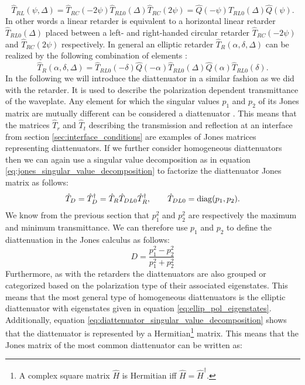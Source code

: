 \begin{equation}
    \hat{T}_{RL}(\psi, \Delta)=\hat{T}_{RC}(-2\psi)\hat{T}_{RL0}(\Delta)\hat{T}_{RC}(2\psi)=
    \hat{Q}(-\psi)\hat{T}_{RL0}(\Delta)\hat{Q}(\psi).
\end{equation}
In other words a linear retarder is equivalent to a horizontal linear retarder $\hat{T}_{RL0}(\Delta)$ placed between a left- and right-handed circular retarder $\hat{T}_{RC}(-2\psi)$ and $\hat{T}_{RC}(2\psi)$ respectively. In general an elliptic retarder $\hat{T}_R(\alpha, \delta, \Delta)$ can be realized by the following combination of elements \cite{GilPerez2017PolarizedApproach}:
\begin{equation}
    \hat{T}_R(\alpha, \delta, \Delta)=
    \hat{T}_{RL0}(-\delta)\hat{Q}(-\alpha)\hat{T}_{RL0}(\Delta)\hat{Q}(\alpha)\hat{T}_{RL0}(\delta).
\end{equation}
In the following we will introduce the diattenuator in a similar fashion as we did with the retarder. It is used to describe the polarization dependent transmittance of the waveplate. Any element for which the singular values $p_1$ and $p_2$ of its Jones matrix are mutually different can be considered a diattenuator \cite{Savenkov2005ConditionsBirefringent}. This means that the matrices $\hat{T}_r$ and $\hat{T}_t$ describing the transmission and reflection at an interface from section \ref{sec:interface_conditions} are examples of Jones matrices representing diattenuators. If we further consider homogeneous diattenuators then we can again use a singular value decomposition as in equation \ref{eq:jones_singular_value_decomposition} to factorize the diattenuator Jones matrix as follows:
\begin{equation}
    \label{eq:diattenuator_singular_value_decomposition}
    \hat{T}_D = \hat{T}_D^{\dagger} = \hat{T}_R\hat{T}_{DL0}\hat{T}_R^{\dagger}, 
    \qquad 
    \hat{T}_{DL0}=\operatorname{diag}(p_1, p_2).
\end{equation}
We know from the previous section that $p_1^2$ and $p_2^2$ are respectively the maximum and minimum transmittance. We can therefore use $p_1$ and $p_2$ to define the diattenuation in the Jones calculus as follows: 
\begin{equation}
    \label{eq:diattenuation_1}
    D = \frac{p_1^2-p_2^2}{p_1^2+p_2^2}
\end{equation}
Furthermore, as with the retarders the diattenuators are also grouped or categorized based on the polarization type of their associated eigenstates. This means that the most general type of homogeneous diattenuators is the elliptic diattenuator with eigenstates given in equation \ref{eq:ellip_pol_eigenstates}. Additionally, equation \ref{eq:diattenuator_singular_value_decomposition} shows that the diattenuator is represented by a Hermitian\footnote{A complex square matrix $\hat{H}$ is Hermitian iff $\hat{H}=\hat{H}^{\dagger}$.} matrix. This means that the Jones matrix of the most common diattenuator can be written as:
